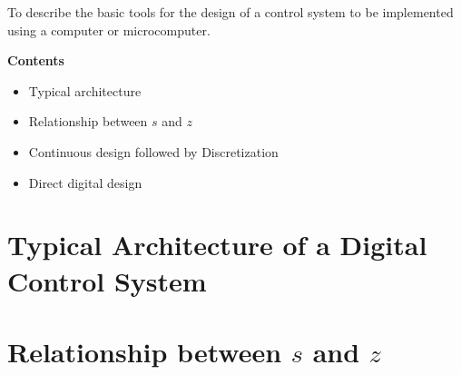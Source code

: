 \def\FileDate{10/01/21}
\def\FileVersion{1.0}

\begin{slide}
	To describe the basic tools for the design of a control system to be implemented using a computer or microcomputer.

	\textbf{Contents}
	\begin{itemize}
		\item Typical architecture
		\item Relationship between $s$ and $z$
		\item Continuous design followed by Discretization
		\item Direct digital design
	\end{itemize}
\end{slide}

\section*{Typical Architecture of a Digital Control System}

\begin{slide}
	\begin{center}
\end{center}
\end{slide}

\section*{Relationship between $s$ and $z$}

